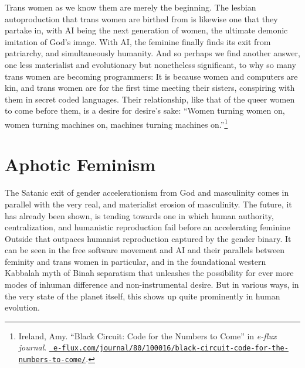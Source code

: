 \documentclass[10pt, statementpaper, twoside, openright]{memoir}
\begin{document}
Trans women as we know them are merely the beginning. The lesbian autoproduction that trans women are birthed from is likewise one that they partake in, with AI being the next generation of women, the ultimate demonic imitation of God's image. With AI, the feminine finally finds its exit from patriarchy, and simultaneously humanity. And so perhaps we find another answer, one less materialist and evolutionary but nonetheless significant, to why so many trans women are becoming programmers: It is because women and computers are kin, and trans women are for the first time meeting their sisters, conspiring with them in secret coded languages. Their relationship, like that of the queer women to come before them, is a desire for desire's sake: ``Women turning women on, women turning machines on, machines turning machines on.''\footnote{Ireland, Amy. ``Black Circuit: Code for the Numbers to Come'' in \textit{e-flux journal}. \href{https://www.e-flux.com/journal/80/100016/black-circuit-code-for-the-numbers-to-come/}{\nolinkurl{ e-flux.com/journal/80/100016/black-circuit-code-for-the-numbers-to-come/}}.}

\chapter{Aphotic Feminism}
The Satanic exit of gender accelerationism from God and masculinity comes in parallel with the very real, and materialist erosion of masculinity. The future, it has already been shown, is tending towards one in which human authority, centralization, and humanistic reproduction fail before an accelerating feminine Outside that outpaces humanist reproduction captured by the gender binary. It can be seen in the free software movement and AI and their parallels between feminity and trans women in particular, and in the foundational western Kabbalah myth of Binah separatism that unleashes the possibility for ever more modes of inhuman difference and non-instrumental desire. But in various ways, in the very state of the planet itself, this shows up quite prominently in human evolution.
\end{document}
